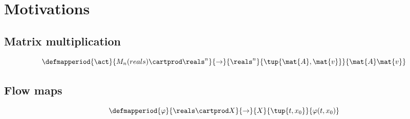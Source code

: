 
\section{Motivations}
\label{sec:simplest-dyn-system}


\subsection{Matrix multiplication}

\begin{equation}
\defmapperiod{
         \act
        }{
           M_n(reals) \cartprod \reals^n
        }{
           \to
        }{
           \reals^n 
        }{
          \tup{\mat{A}, \mat{v}}
        }{
           \mat{A}\mat{v}
           }
\end{equation}

\subsection{Flow maps}

\begin{equation}
\defmapperiod{
         \varphi
        }{
           \reals \cartprod X
        }{
           \to
        }{
           X 
        }{
          \tup{t, x_0}
        }{
           \varphi(t, x_0)
           }
\end{equation}




